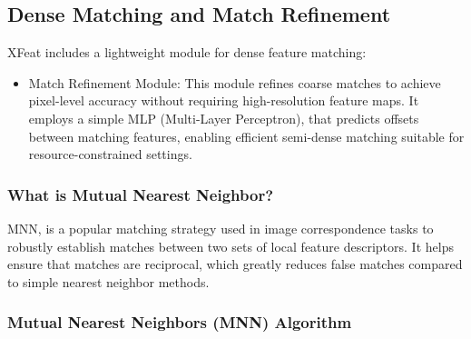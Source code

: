 \subsection{Dense Matching and Match Refinement}
XFeat includes a lightweight module for dense feature matching:
\begin{itemize}
    \item Match Refinement Module: This module refines coarse matches to achieve
          pixel-level accuracy without requiring high-resolution feature maps. It employs
          a simple MLP (Multi-Layer Perceptron), that predicts offsets between matching
          features, enabling efficient semi-dense matching suitable for
          resource-constrained settings.
\end{itemize}
\subsubsection{What is Mutual Nearest Neighbor?}
MNN, is a popular matching strategy used in image correspondence tasks to
robustly establish matches between two sets of local feature descriptors. It
helps ensure that matches are reciprocal, which greatly reduces false matches
compared to simple nearest neighbor methods. \subsubsection*{Mutual Nearest
    Neighbors (MNN) Algorithm}
